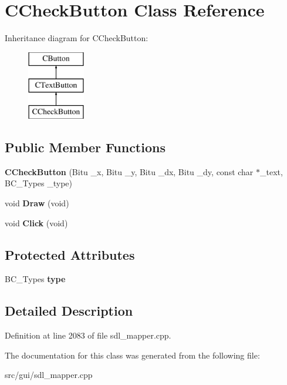 \hypertarget{classCCheckButton}{\section{C\-Check\-Button Class Reference}
\label{classCCheckButton}
}
Inheritance diagram for C\-Check\-Button\-:\begin{figure}[H]
\begin{center}
\leavevmode
\includegraphics[height=3.000000cm]{classCCheckButton}
\end{center}
\end{figure}
\subsection*{Public Member Functions}
\begin{DoxyCompactItemize}
\item 
\hypertarget{classCCheckButton_a54c679603fea5cb3e04277f6099d2067}{{\bfseries C\-Check\-Button} (Bitu \-\_\-x, Bitu \-\_\-y, Bitu \-\_\-dx, Bitu \-\_\-dy, const char $\ast$\-\_\-text, B\-C\-\_\-\-Types \-\_\-type)}\label{classCCheckButton_a54c679603fea5cb3e04277f6099d2067}

\item 
\hypertarget{classCCheckButton_a1893209408d4822886cd6e39aab69db4}{void {\bfseries Draw} (void)}\label{classCCheckButton_a1893209408d4822886cd6e39aab69db4}

\item 
\hypertarget{classCCheckButton_a5d3d194c8eedc74fbb7862165737833e}{void {\bfseries Click} (void)}\label{classCCheckButton_a5d3d194c8eedc74fbb7862165737833e}

\end{DoxyCompactItemize}
\subsection*{Protected Attributes}
\begin{DoxyCompactItemize}
\item 
\hypertarget{classCCheckButton_a5351f20571c7ed787def47ae73a1820f}{B\-C\-\_\-\-Types {\bfseries type}}\label{classCCheckButton_a5351f20571c7ed787def47ae73a1820f}

\end{DoxyCompactItemize}


\subsection{Detailed Description}


Definition at line 2083 of file sdl\-\_\-mapper.\-cpp.



The documentation for this class was generated from the following file\-:\begin{DoxyCompactItemize}
\item 
src/gui/sdl\-\_\-mapper.\-cpp\end{DoxyCompactItemize}

